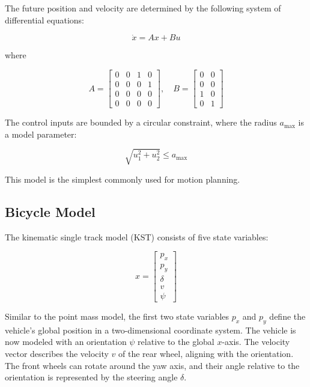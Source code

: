 The future position and velocity are determined by the following system of differential equations:

\begin{equation}
	\dot{x} = A x + B u
\end{equation}

where

\begin{equation}
	A = \begin{bmatrix} 0 & 0 & 1 & 0 \\ 0 & 0 & 0 & 1 \\ 0 & 0 & 0 & 0 \\ 0 & 0 & 0 & 0 \end{bmatrix}, \quad
	B = \begin{bmatrix} 0 & 0 \\ 0 & 0 \\ 1 & 0 \\ 0 & 1 \end{bmatrix}
\end{equation}

The control inputs are bounded by a circular constraint, where the radius $a_{\max}$ is a model parameter:

\begin{equation}
	\sqrt{u_1^2 + u_2^2} \leq a_{\max}
\end{equation}

This model is the simplest commonly used for motion planning.

\subsection{Bicycle Model} \label{subsec:bicycle_model}

The kinematic single track model (KST) consists of five state variables:

\begin{equation}
	x = \begin{bmatrix} p_x \\ p_y \\ \delta \\ v \\ \psi \end{bmatrix}
	\label{eq:states_kst}
\end{equation}

Similar to the point mass model, the first two state variables $p_x$ and $p_y$ define the vehicle's global position in a two-dimensional coordinate
system.
The vehicle is now modeled with an orientation $\psi$ relative to the global $x$-axis.
The velocity vector describes the velocity $v$ of the rear wheel, aligning with the orientation.
The front wheels can rotate around the yaw axis, and their angle relative to the orientation is represented by the steering angle $\delta$.

